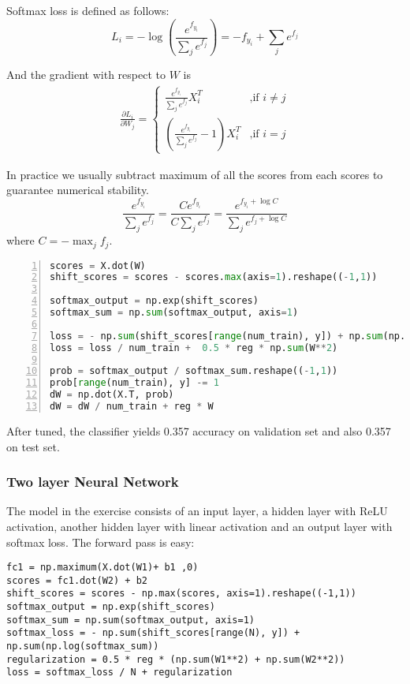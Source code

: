 \documentclass{article} %
\begin{document}
Softmax loss is defined as follows:
$$L_i=-\log\left( \frac{e^{f_{y_i}}}{\sum_j e^{f_j}}\right)=-f_{y_i}+\sum_j e^{f_j}$$

And the gradient with respect to $W$ is
\begin{eqnarray*}
\frac{\partial L_i}{\partial W_j}=
\left\{ 
    \begin{array}{ll}
        \frac{e^{f_{y_i}}}{\sum_j e^{f_j}}X_i^T & \mbox{,if $i \ne j$}\\
        \left(\frac{e^{f_{y_i}}}{\sum_j e^{f_j}}-1\right)X_i^T & \mbox{,if $i = j$}
    \end{array}
\right.
\end{eqnarray*}

In practice we usually subtract maximum of all the scores from each scores to guarantee numerical stability.
$$\frac{e^{f_{y_i}}}{\sum_j e^{f_j}}=\frac{Ce^{f_{y_i}}}{C\sum_j e^{f_j}}=\frac{e^{f_{y_i}+\log C}}{\sum_j e^{f_j+\log C}}$$
where $C=-\max_j f_j$.

\begin{lstlisting}[language=python, numbers=left]
scores = X.dot(W)
shift_scores = scores - scores.max(axis=1).reshape((-1,1))

softmax_output = np.exp(shift_scores)
softmax_sum = np.sum(softmax_output, axis=1)

loss = - np.sum(shift_scores[range(num_train), y]) + np.sum(np.log(softmax_sum))
loss = loss / num_train +  0.5 * reg * np.sum(W**2)

prob = softmax_output / softmax_sum.reshape((-1,1))
prob[range(num_train), y] -= 1
dW = np.dot(X.T, prob)
dW = dW / num_train + reg * W
\end{lstlisting}

After tuned, the classifier yields 0.357 accuracy on validation set and also 0.357 on test set.

\subsubsection{Two layer Neural Network}
The model in the exercise consists of an input layer, a hidden layer with ReLU activation, another hidden layer with linear activation and an output layer with softmax loss. The forward pass is easy:
\begin{lstlisting}
fc1 = np.maximum(X.dot(W1)+ b1 ,0)
scores = fc1.dot(W2) + b2
shift_scores = scores - np.max(scores, axis=1).reshape((-1,1))
softmax_output = np.exp(shift_scores)
softmax_sum = np.sum(softmax_output, axis=1)
softmax_loss = - np.sum(shift_scores[range(N), y]) + np.sum(np.log(softmax_sum))
regularization = 0.5 * reg * (np.sum(W1**2) + np.sum(W2**2))
loss = softmax_loss / N + regularization
\end{lstlisting} 
\end{document}
